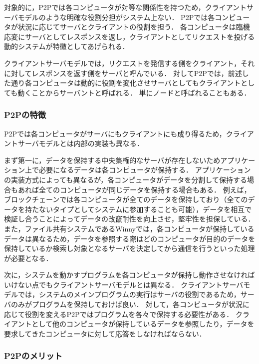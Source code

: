 対象的に，P2Pでは各コンピュータが対等な関係性を持つため，クライアントサーバモデルのような明確な役割分担がシステム上ない．
P2Pでは各コンピュータが状況に応じてサーバとクライアントの役割を担う．
各コンピュータは臨機応変にサーバとしてレスポンスを返し，クライアントとしてリクエストを投げる動的システムが特徴としてあげられる．

クライアントサーバモデルでは，リクエストを発信する側をクライアント，それに対してレスポンスを返す側をサーバと呼んでいる．
対してP2Pでは，前述した通り各コンピュータは動的に役割を変化させサーバとしてもクライアントとしても動くことからサーバントと呼ばれる．
単にノードと呼ばれることもある．

\subsubsection{P2Pの特徴}

P2Pでは各コンピュータがサーバにもクライアントにも成り得るため，クライアントサーバモデルとは内部の実装も異なる．

まず第一に，データを保持する中央集権的なサーバが存在しないためアプリケーション上で必要になるデータは各コンピュータが保持する．
アプリケーションの実装方式によっても異なるが，各コンピュータがデータを分割して保持する場合もあれば全てのコンピュータが同じデータを保持する場合もある．
例えば，ブロックチェーンでは各コンピュータが全てのデータを保持しており（全てのデータを持たないタイプとしてシステムに参加することも可能），データを相互で検証し合うことによってデータの改竄耐性を向上させ，堅牢性を担保している．
また，ファイル共有システムであるWinnyでは，各コンピュータが保持しているデータは異なるため，データを参照する際はどのコンピュータが目的のデータを保持しているか検索し対象となるサーバを決定してから通信を行うといった処理が必要となる．

次に，システムを動かすプログラムを各コンピュータが保持し動作させなければいけない点でもクライアントサーバモデルとは異なる．
クライアントサーバモデルでは，システムのメインプログラムの実行はサーバの役割であるため，サーバのみがプログラムを保持しておけば良い．
対して，各コンピュータが状況に応じて役割を変えるP2Pではプログラムを各々で保持する必要性がある．
クライアントとして他のコンピュータが保持しているデータを参照したり，データを要求してきたコンピュータに対して応答をしなければならない．

\subsubsection{P2Pのメリット}

